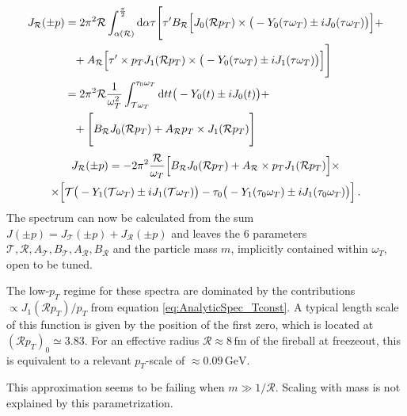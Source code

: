 \begin{subequations}
    \begin{align}
        J_{\mathcal{R}}(\pm p)&=2\pi^2\mathcal{R}\int_{\alpha(\mathcal{R})}^{\frac{\pi}{2}}\text{d}\alpha \tau\Bigg[\tau^\prime B_{\mathcal{R}}\Big[J_0(\mathcal{R}p_T)\times\big(-Y_0(\tau\omega_T)\pm{i} J_0(\tau\omega_T)\big)\Big]+\nonumber                                                                                             \\
        &\phantom{=}+ A_{\mathcal{R}}\Big[\tau^\prime\times p_TJ_1(\mathcal{R}p_T)\times\big(-Y_0(\tau\omega_T)\pm{i} J_1(\tau\omega_T)\big)\Big]\Bigg]\\
        &=2\pi^2\mathcal{R}\frac{1}{\omega_T^2}\int_{\mathcal{T}\omega_T}^{\tau_0\omega_T}\text{d} tt\big(-Y_0(t)\pm{i} J_0(t)\big)+\nonumber                                                                                             \\
        &\phantom{=}+\Bigg[B_{\mathcal{R}}J_0(\mathcal{R}p_T)+A_{\mathcal{R}}p_T\times J_1(\mathcal{R} p_T)\Bigg]
    \end{align}
\end{subequations}
\begin{multline}
    J_{\mathcal{R}}(\pm p)=-2\pi^2\frac{\mathcal{R}}{\omega_T}\Big[B_{\mathcal{R}}J_0(\mathcal{R}p_T)+A_{\mathcal{R}}\times p_TJ_1(\mathcal{R}p_T)\Big]\times\\
    \times\Big[\mathcal{T}\big(-Y_1(\mathcal{T}\omega_T)\pm{i} J_1(\mathcal{T}\omega_T)\big)-\tau_0\big(-Y_1(\tau_0\omega_T)\pm{i} J_1(\tau_0\omega_T)\big)\Big]\,.
\end{multline}
The spectrum can now be calculated from the sum ${J(\pm p)=J_{\mathcal{T}}(\pm p)+J_{\mathcal{R}}(\pm p)}$ and leaves the 6 parameters ${\mathcal{T},\mathcal{R},A_{\mathcal{T}},B_{\mathcal{T}},A_{\mathcal{R}},B_{\mathcal{R}}}$ and the particle mass $m$, implicitly contained within $\omega_T$, open to be tuned.

The low-$p_T$ regime for these spectra are dominated by the contributions ${\propto J_1(\mathcal{R}p_T)/p_T}$ from equation \eqref{eq:AnalyticSpec_Tconst}. A typical length scale of this function is given by the position of the first zero, which is located at ${(\mathcal{R}p_T)_0\simeq 3.83}$. For an effective radius ${\mathcal{R}\approx 8\,\mathrm{fm}}$ of the fireball at freezeout, this is equivalent to a relevant $p_T$-scale of ${\approx 0.09\, \mathrm{GeV}}$. 

This approximation seems to be failing when ${m\gg 1/\mathcal{R}}$. Scaling with mass is not explained by this parametrization.